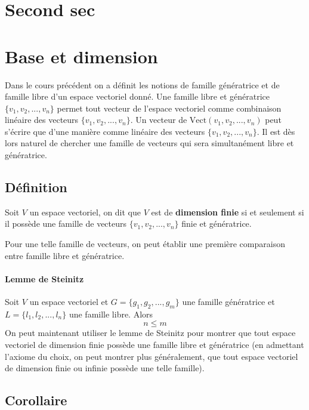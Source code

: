 \documentclass[
    11pt,
    a4paper,
    oneside,
    headinlcude, footinclude,
    twoside,
]{report}
\begin{document}
\section{Second sec }
\label{sec:first_sec}

\section{Base et dimension}
Dans le cours précédent on a définit les notions de famille génératrice et de
famille libre d'un espace vectoriel donné. Une famille libre et génératrice
$\{v_{1}, v_{2}, ..., v_{n}\}$ permet tout vecteur de l'espace vectoriel comme
combinaison linéaire des vecteurs $\{v_{1}, v_{2}, ..., v_{n}\}$. Un vecteur
de $\text{Vect}(v_{1}, v_{2}, ..., v_{n})$ peut s'écrire que d'une manière
comme linéaire des vecteurs $\{v_{1}, v_{2}, ..., v_{n}\}$. Il est dès lors
naturel de chercher une famille de vecteurs qui sera simultanément libre et
génératrice.

\subsection{Définition}
\label{sub:definition}

Soit $V$ un espace vectoriel, on dit que $V$  est de \textbf{dimension finie}
si et seulement si il possède une famille de vecteurs $\{v_{1}, v_{2}, ...,
v_{n}\}$ finie et génératrice.

Pour une telle famille de vecteurs, on peut établir une première comparaison
entre famille libre et génératrice.

\paragraph{Lemme de Steinitz}
\label{par:lemme_de_steinitz}

Soit $V$ un espace vectoriel et $G = \{g_{1}, g_{2}, ..., g_{m}\}$ une famille
génératrice et $L = \{l_{1}, l_{2}, ..., l_{n}\}$ une famille libre. Alors $$n
\leq m$$
On peut maintenant  utiliser le lemme de Steinitz pour montrer que tout
espace vectoriel de dimension finie possède une famille libre et génératrice
(en admettant l'axiome du choix, on peut montrer plus généralement, que tout
espace vectoriel de dimension finie ou infinie possède une telle famille).

\subsection{Corollaire}
\label{sub:corollaire}
\end{document}

